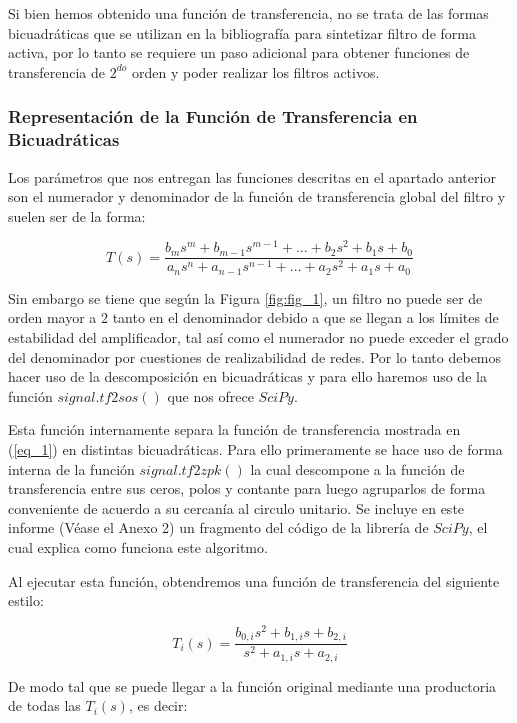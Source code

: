 \documentclass[12pt,a4paper]{article}
\begin{document}
Si bien hemos obtenido una función de transferencia, no se trata de las formas bicuadráticas que se utilizan en la bibliografía para sintetizar filtro de forma activa, por lo tanto se requiere un paso adicional para obtener funciones de transferencia de $2^{do}$ orden y poder realizar los filtros activos.


\subsubsection{Representación de la Función de Transferencia en Bicuadráticas}
Los parámetros que nos entregan las funciones descritas en el apartado anterior son el numerador y denominador de la función de transferencia global del filtro y suelen ser de la forma: 

\begin{equation}
    \label{eq_1}
    T(s) = \frac{b_{m}s^{m} + b_{m - 1}s^{m - 1} + ... + b_{2}s^{2} + b_{1}s + b_{0}}{a_{n}s^{n} + a_{n - 1}s^{n - 1} + ... + a_{2}s^{2} + a_{1}s + a_{0}}
\end{equation}

Sin embargo se tiene que según la Figura \ref{fig:fig_1}, un filtro no puede ser de orden mayor a $2$ tanto en el denominador debido a que se llegan a los límites de estabilidad del amplificador, tal así como el numerador no puede exceder el grado del denominador por cuestiones de realizabilidad de redes. Por lo tanto debemos hacer uso de la descomposición en bicuadráticas y para ello haremos uso de la función $signal.tf2sos()$ que nos ofrece $SciPy$.

Esta función internamente separa la función de transferencia mostrada en (\ref{eq_1}) en distintas bicuadráticas. Para ello primeramente se hace uso de forma interna de la función $signal.tf2zpk()$ la cual descompone a la función de transferencia entre sus ceros, polos y contante para luego agruparlos de forma conveniente de acuerdo a su cercanía al circulo unitario. Se incluye en este informe (Véase el Anexo 2) un fragmento del código de la librería de $SciPy$, el cual explica como funciona este algoritmo.

Al ejecutar esta función, obtendremos una función de transferencia del siguiente estilo:
    
\begin{equation}
    \label{eq_2}
    T_{i}(s) = \frac{b_{0,i}s^{2} + b_{1,i}s + b_{2,i}}{s^{2} + a_{1,i}s + a_{2,i}}
\end{equation}

De modo tal que se puede llegar a la función original mediante una productoria de todas las $T_{i}(s)$, es decir:
\end{document}
